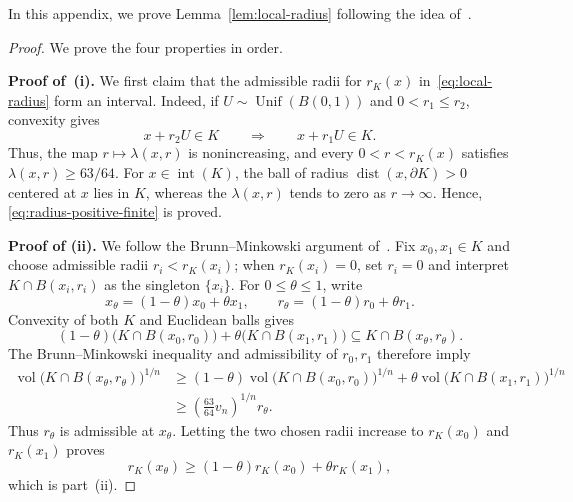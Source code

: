 \documentclass[11pt]{article}
\theoremstyle{definition}
\theoremstyle{remark}
\newcommand{\vol}{\operatorname{vol}}
\newcommand{\Unif}{\operatorname{Unif}}
\newcommand{\rK}{r_K}
\begin{document}
In this appendix, we prove Lemma~\ref{lem:local-radius} following the idea of~\cite{LV}.

\lemlocalconductance*

\begin{proof}
We prove the four properties in order.

\textbf{Proof of~\textup{(i)}.} We first claim that the admissible radii for $\rK(x)$ in~\eqref{eq:local-radius} form an interval.  Indeed, if $U\sim\Unif(B(0,1))$ and $0<r_1\le r_2$, convexity gives
\[
 x+r_2U\in K
 \qquad\Longrightarrow\qquad
 x+r_1U \in K.
\]
Thus, the map $r\mapsto\lambda(x,r)$ is nonincreasing, and every
$0<r<\rK(x)$ satisfies $\lambda(x,r)\ge63/64$.
For \(x\in{\operatorname{int}(K)}\), the ball of radius
\(\operatorname{dist}(x,\partial K)>0\) centered at \(x\) lies in \(K\), whereas the $\lambda(x,r)$ tends to zero as \(r\to\infty\). Hence, \eqref{eq:radius-positive-finite} is proved.


\textbf{Proof of \textup{(ii)}.} We follow the Brunn--Minkowski argument of~\cite[Lemma~3.1]{LV}.  Fix $x_0,x_1\in K$ and choose
admissible radii $r_i<\rK(x_i)$; when $\rK(x_i)=0$, set $r_i=0$ and
interpret $K\cap B(x_i,r_i)$ as the singleton $\{x_i\}$.  For
$0\le\theta\le1$, write
\[
 x_\theta=(1-\theta)x_0+\theta x_1,
 \qquad
 r_\theta=(1-\theta)r_0+\theta r_1.
\]
Convexity of both $K$ and Euclidean balls gives
\[
 (1-\theta)\bigl(K\cap B(x_0,r_0)\bigr)
 +\theta\bigl(K\cap B(x_1,r_1)\bigr)
 \subseteq K\cap B(x_\theta,r_\theta).
\]
The Brunn--Minkowski inequality and admissibility of $r_0,r_1$ therefore
imply
\[
 \begin{aligned}
 \vol\bigl(K\cap B(x_\theta,r_\theta)\bigr)^{1/n}
 &\ge (1-\theta)\vol\bigl(K\cap B(x_0,r_0)\bigr)^{1/n}
      +\theta\vol\bigl(K\cap B(x_1,r_1)\bigr)^{1/n}\\
 &\ge \left(\frac{63}{64}v_n\right)^{1/n}r_\theta.
 \end{aligned}
\]
Thus $r_\theta$ is admissible at $x_\theta$.  Letting the two chosen radii
increase to $\rK(x_0)$ and $\rK(x_1)$ proves
\[
 \rK(x_\theta)\ge(1-\theta)\rK(x_0)+\theta\rK(x_1),
\]
which is part~\textup{(ii)}.


\end{proof}
\end{document}

